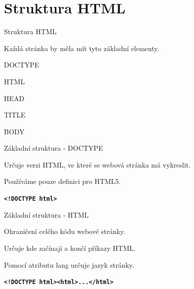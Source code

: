 \documentclass[aspectratio=169]{beamer}
\begin{document}
\section{Struktura HTML}
\begin{frame}{Struktura HTML}
    \begin{cardTiny}
        \begin{flushleft}
            Každá stránka by měla mít tyto základní elementy.
        \end{flushleft}
    \end{cardTiny}
    \begin{cardTiny}
        \begin{flushleft}
            DOCTYPE

            HTML

            HEAD

            TITLE

            BODY
        \end{flushleft}
    \end{cardTiny}
\end{frame}

\begin{frame}{Základní struktura - DOCTYPE}
    \begin{cardTiny}
        \begin{flushleft}
            Určuje verzi HTML, ve které se webová stránka má vykreslit.

            Používáme pouze definici pro HTML5.
        \end{flushleft}
    \end{cardTiny}
    \begin{cardTiny}
        \begin{flushleft}
        \texttt{\textbf{<!DOCTYPE html>}}
        \end{flushleft}
    \end{cardTiny}
\end{frame}

\begin{frame}{Základní struktura - HTML}
    \begin{cardTiny}
        \begin{flushleft}
            Ohraničení celého kódu webové stránky.

            Určuje kde začínají a končí příkazy HTML.
        
            Pomocí atributu lang určuje jazyk stránky.
        \end{flushleft}
    \end{cardTiny}
    \begin{cardTiny}
        \begin{flushleft}
        \texttt{\textbf{<!DOCTYPE html><html>...</html>}}
        \end{flushleft}
    \end{cardTiny}
\end{frame}
\end{document}
